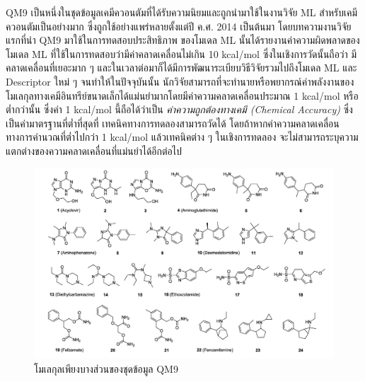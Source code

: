 QM9 เป็นหนึ่งในชุดข้อมูลเคมีควอนตัมที่ได้รับความนิยมและถูกนำมาใช้ในงานวิจัย ML สำหรับเคมีควอนตัมเป็นอย่างมาก ซึ่งถูกใช้อย่างแพร่หลายตั้งแต่ปี 
ค.ศ. 2014 เป็นต้นมา\autocite{ruddigkeit2012,ramakrishnan2014} โดยบทความงานวิจัยแรกที่นำ QM9 มาใช้ในการทดสอบประสิทธิภาพ%
ของโมเดล ML นั้นได้รายงานค่าความผิดพลาดของโมเดล ML ที่ใช้ในการทดสอบว่ามีค่าคลาดเคลื่อนไม่เกิน 10 kcal/mol ซึ่งในเชิงการวัดนั้นถือว่า%
มีคลาดเคลื่อนที่เยอะมาก ๆ และในเวลาต่อมาก็ได้มีการพัฒนาระเบียบวิธีวิจัยรวมไปถึงโมเดล ML และ Descriptor ใหม่ ๆ จนทำให้ในปัจจุบันนั้น%
นักวิจัยสามารถที่จะทำนายหรือพยากรณ์ค่าพลังงานของโมเลกุลทางเคมีอินทรีย์ขนาดเล็กได้แม่นยำมากโดยมีค่าความคลาดเคลื่อนประมาณ 1 kcal/mol 
หรือต่ำกว่านั้น ซึ่งค่า 1 kcal/mol นี้ถือได้ว่าเป็น \textit{ค่าความถูกต้องทางเคมี (Chemical Accuracy)} ซึ่งเป็นค่ามาตรฐานที่ต่ำที่สุดที่%
เทคนิคทางการทดลองสามารถวัดได้ โดยถ้าหากค่าความคลาดเคลื่อนทางการคำนวณที่ต่ำไปกว่า 1 kcal/mol แล้วเทคนิคต่าง ๆ ในเชิงการทดลอง%
จะไม่สามารถระบุความแตกต่างของความคลาดเคลื่อนที่แม่นยำได้อีกต่อไป

\begin{figure}[H]
    \centering
    \includegraphics[width=\linewidth]{fig/qm9_molecules.jpg}
    \caption{โมเลกุลเพียงบางส่วนของชุดข้อมูล QM9}
    \label{fig:m9_mol}
\end{figure}

